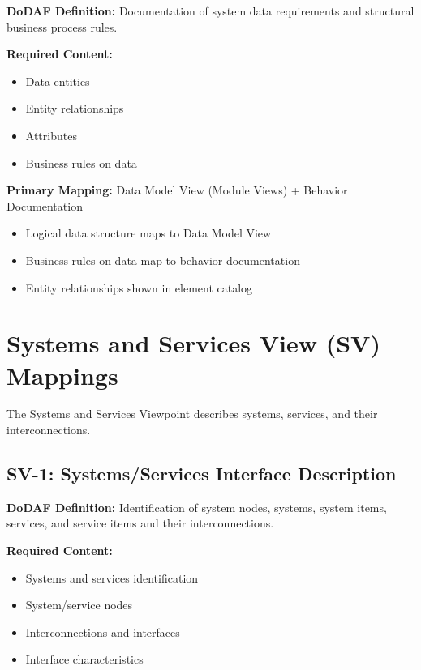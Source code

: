 \documentclass[11pt]{article}
\begin{document}
\begin{dodafbox}
\textbf{DoDAF Definition:} Documentation of system data requirements and structural business process rules.

\textbf{Required Content:}
\begin{itemize}[nosep]
    \item Data entities
    \item Entity relationships
    \item Attributes
    \item Business rules on data
\end{itemize}
\end{dodafbox}

\begin{vbbox}
\textbf{Primary Mapping:} Data Model View (Module Views) + Behavior Documentation

\begin{itemize}
    \item Logical data structure maps to Data Model View
    \item Business rules on data map to behavior documentation
    \item Entity relationships shown in element catalog
\end{itemize}
\end{vbbox}

\section{Systems and Services View (SV) Mappings}

The Systems and Services Viewpoint describes systems, services, and their interconnections.

\subsection{SV-1: Systems/Services Interface Description}

\begin{dodafbox}
\textbf{DoDAF Definition:} Identification of system nodes, systems, system items, services, and service items and their interconnections.

\textbf{Required Content:}
\begin{itemize}[nosep]
    \item Systems and services identification
    \item System/service nodes
    \item Interconnections and interfaces
    \item Interface characteristics
\end{itemize}
\end{dodafbox}
\end{document}
